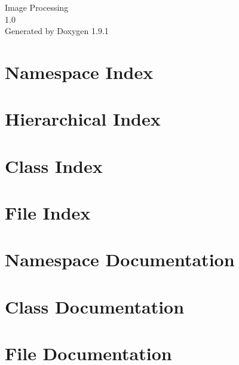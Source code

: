 \let\mypdfximage\pdfximage\def\pdfximage{\immediate\mypdfximage}\documentclass[twoside]{book}
\newcommand{\+}{\discretionary{\mbox{\scriptsize$\hookleftarrow$}}{}{}}
\newcommand{\clearemptydoublepage}{%
  \newpage{\pagestyle{empty}\cleardoublepage}%
}
\begin{document}
\raggedbottom

\hypersetup{pageanchor=false,
             bookmarksnumbered=true,
             pdfencoding=unicode
            }
\begin{titlepage}
\vspace*{7cm}
\begin{center}%
{\Large Image Processing \\[1ex]\large 1.\+0 }\\
\vspace*{1cm}
{\large Generated by Doxygen 1.9.1}\\
\end{center}
\end{titlepage}
\clearemptydoublepage
{}
\tableofcontents
\clearemptydoublepage
{}
\hypersetup{pageanchor=true}

\chapter{Namespace Index}

\chapter{Hierarchical Index}

\chapter{Class Index}

\chapter{File Index}

\chapter{Namespace Documentation}

\chapter{Class Documentation}







\chapter{File Documentation}








\backmatter
\newpage
{}
\clearemptydoublepage
{}
\printindex
\end{document}
